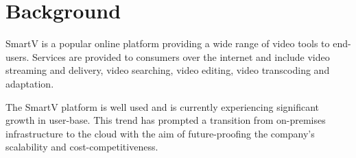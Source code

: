 \section{Background}

SmartV is a popular online platform providing a wide range of video tools to end-users. Services are provided to consumers over the internet and include video streaming and delivery, video searching, video editing, video transcoding and adaptation.

The SmartV platform is well used and is currently experiencing significant growth in user-base. This trend has prompted a transition from on-premises infrastructure to the cloud with the aim of future-proofing the company's scalability and cost-competitiveness.

%


